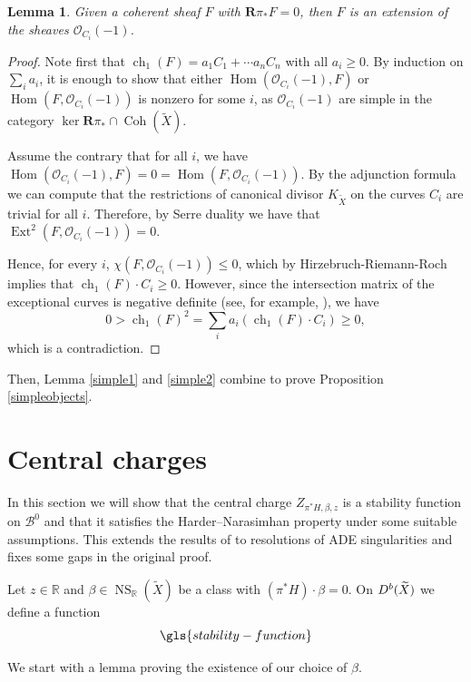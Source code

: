 \documentclass[12pt]{amsart}
\newtheorem{lemma}[theorem]{Lemma}
\theoremstyle{definition}
\DeclareMathOperator{\Hom}{Hom}
\DeclareMathOperator{\Ext}{Ext}
\DeclareMathOperator{\Coh}{Coh}
\DeclareMathOperator{\ch}{ch}
\DeclareMathOperator{\NS}{NS}
\begin{document}
\begin{lemma}\label{generatorofker}
Given a coherent sheaf $F$ with $\mathbf{R}\pi_\ast F=0$, then $F$ is an extension of the sheaves $\mathcal{O}_{C_i}(-1)$. 
\end{lemma}
\begin{proof}
Note first that $\ch_1(F) =  a_1C_1+ \cdots a_nC_n$ with all $a_i \geq 0$.
By induction on $\displaystyle \sum_i a_i$, 
it is enough to show that either $\Hom(\mathcal{O}_{C_i}(-1),F)$ or $\Hom(F,\mathcal{O}_{C_i}(-1))$ is nonzero for some $i$,
as $\mathcal{O}_{C_i}(-1)$ are simple in the category $\ker \mathbf{R}\pi_\ast \cap \Coh(\widetilde{X})$.

Assume the contrary that for all $i$, we have $\Hom(\mathcal{O}_{C_i}(-1),F) = 0 = \Hom(F,\mathcal{O}_{C_i}(-1))$.
By the adjunction formula we can compute that the restrictions of canonical divisor $K_{\widetilde{X}}$ on the curves $C_i$ are trivial for all $i$.
Therefore, by Serre duality we have that $\Ext^2(F,\mathcal{O}_{C_i}(-1)) = 0$.

Hence, for every $i$, $\chi(F,\mathcal{O}_{C_i}(-1)) \leq 0$, which by Hirzebruch-Riemann-Roch implies that $\ch_1(F) \cdot C_i \geq 0$.
However, since the intersection matrix of the exceptional curves is negative definite (see, for example, \cite{Reid}), 
we have $$0 > \ch_1(F)^2 = \displaystyle \sum_i a_i(\ch_1(F) \cdot C_i) \geq 0,$$ which is a contradiction.
\end{proof}



Then, Lemma \ref{simple1} and \ref{simple2} combine to prove Proposition \ref{simpleobjects}.



\section{Central charges}
In this section we will show that the central charge $Z_{\pi^\ast H,\beta,z}$ is a stability function on $\mathcal{B}^0$ and that it satisfies the Harder--Narasimhan property under some suitable assumptions.
This extends the results of \cite{TX22} to resolutions of ADE singularities and fixes some gaps in the original proof.

Let $z\in \mathbb{R}$ and $\beta \in \NS_\mathbb{R}(\widetilde{X})$ be a class with $(\pi^\ast H)\cdot \beta =0$.
On ${\rm D}^b(\widetilde{X})$ we define a function 
\[\gls{stability-function} \]

We start with a lemma proving the existence of our choice of $\beta$.
\end{document}
